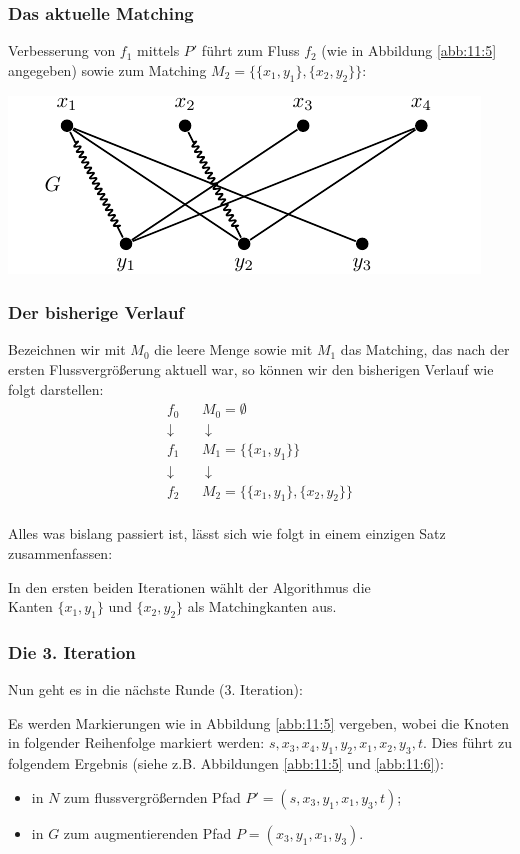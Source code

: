 \documentclass[smaller]{beamer}
\begin{document}
\begin{frame}
 \frametitle{Das aktuelle Matching}
 Verbesserung von $f_1$ mittels $P'$ führt zum Fluss $f_2$ (wie in Abbildung \ref{abb:11:5} angegeben) sowie zum Matching $M_2 = \big\{ \{x_1,y_1\}, \{x_2,y_2\} \big\}$:

\begin{center}
 \includegraphics{fig52.pdf}
\end{center}
\end{frame}

\begin{frame}
 \frametitle{Der bisherige Verlauf}
 Bezeichnen wir mit $M_0$ die leere Menge sowie mit $M_1$ das Matching, das nach der ersten Flussvergrößerung aktuell war, so können wir den bisherigen Verlauf wie folgt darstellen:
\[
\begin{array}{ccl}
f_0 & & M_0 = \emptyset \\
\downarrow & & \ \downarrow \\
f_1 & & M_1 = \big\{ \{x_1,y_1 \} \big\} \\
\downarrow & & \ \downarrow \\
f_2 & & M_2 = \big\{ \{x_1,y_1 \}, \{x_2,y_2\} \big\} \\
\end{array}
\]

Alles was bislang passiert ist, lässt sich wie folgt in einem einzigen Satz zusammenfassen:

\begin{center}
\alert{In den ersten beiden Iterationen wählt der Algorithmus die \\
Kanten $\big\{ x_1,y_1 \big\}$ und $\big\{ x_2,y_2 \big\}$ als Matchingkanten aus.}
\end{center}
\end{frame}

\begin{frame}
 \frametitle{Die 3. Iteration}
  Nun geht es in die nächste Runde (3. Iteration): \\ \vspace*{0.2cm}
  
  Es werden Markierungen wie in Abbildung \ref{abb:11:5} vergeben, wobei die Knoten in folgender Reihenfolge markiert werden: $s,x_3,x_4,y_1,y_2,x_1,x_2,y_3,t$. Dies führt zu folgendem Ergebnis (siehe z.B. Abbildungen \ref{abb:11:5} und \ref{abb:11:6}):
  \begin{itemize}
  \item in $N$ zum \alert{flussvergrößernden Pfad} $P'=(s,x_3,y_1,x_1,y_3,t)$;
  \item in $G$ zum \alert{augmentierenden Pfad} $P=(x_3,y_1,x_1,y_3)$.
  \end{itemize}
\end{frame}
\end{document}
